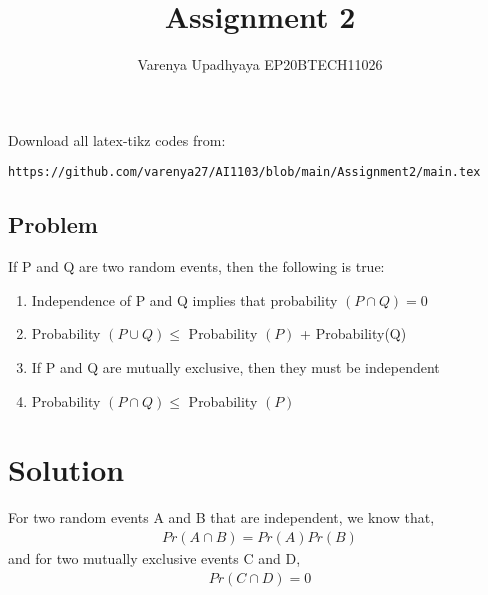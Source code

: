 \documentclass[journal,12pt,twocolumn]{IEEEtran}
\title{Assignment 2}
\author{Varenya Upadhyaya EP20BTECH11026}
\date{}
\begin{document}
\maketitle
Download all latex-tikz codes from:
\begin{lstlisting}
https://github.com/varenya27/AI1103/blob/main/Assignment2/main.tex
\end{lstlisting}
\maketitle   
\begin{center}
\section*{\textbf{Problem}}
\end{center}
If P and Q are two random events, then the following is true:
\begin{enumerate}[label = (\alph*)]
    \item Independence of P and Q implies that probability $(P\cap Q)=0 $ 
    \item Probability $(P\cup Q) \leq   $ Probability $(P)$ + Probability(Q) 
    \item If P and Q are mutually exclusive, then they must be independent
    \item Probability $(P\cap Q) \leq$ Probability $(P)$
\end{enumerate}
\maketitle
\section*{\textbf{Solution}}
For two random events A and B that are independent, we know that, 
\begin{align}
Pr(A\cap B) = Pr(A)Pr(B)
\end{align}
and for two mutually exclusive events C and D, 
\begin{align}
    Pr(C\cap D) = 0
\end{align}
\end{document}
